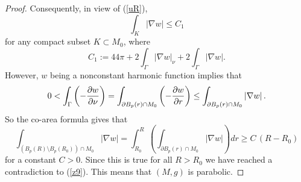 \documentclass{amsart}
\numberwithin{equation}{section}
\begin{document}
\begin{proof}
Consequently, in view of (\ref{uR}),
\begin{equation}
\int_{K}\left\vert \nabla w\right\vert \leq C_1 \label{z9}
\end{equation}%
for any compact subset $K\subset M_0$, where 
$$
C_1:=44\pi +2 \int_{\Gamma }\left\vert \nabla
w\right\vert_\nu +2 \int_{\Gamma }\left\vert \nabla
w\right\vert.
$$
 However,  $w$ being a nonconstant harmonic function implies that 
\begin{equation*}
0<\int_{\Gamma }\left( -\frac{\partial w}{\partial
\nu }\right) =\int_{\partial B_{p}\left( r\right)\cap M_0 }\left( -\frac{\partial w}{%
\partial r}\right) \leq \int_{\partial B_{p}\left( r\right) \cap M_0}\left\vert
\nabla w\right\vert.
\end{equation*}%
So the co-area formula gives that 
\begin{equation*}
\int_{\left(B_{p}\left( R\right) \setminus B_{p}\left( R_0\right) \right) \cap M_0}\left\vert \nabla
w\right\vert =\int_{R_0}^{R}\left( \int_{\partial B_{p}\left( r\right)\cap M_0
}\left\vert \nabla w\right\vert \right) dr\geq C\, (R-R_0)
\end{equation*}
for a constant $C>0.$ Since this is true for all $R>R_0$ we have reached a
contradiction to (\ref{z9}). This means that $\left( M,g\right) $ is
parabolic. 
\end{proof}
\end{document}
